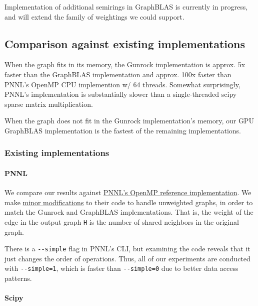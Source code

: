\documentclass[10pt,oneside]{memoir}
\let\oldparagraph\paragraph
\renewcommand{\paragraph}[1]{\oldparagraph{#1}\mbox{}}
\begin{document}
Implementation of additional semirings in GraphBLAS is currently in
progress, and will extend the family of weightings we could support.

\hypertarget{comparison-against-existing-implementations-6}{%
\subsection{Comparison against existing
implementations}\label{comparison-against-existing-implementations-6}}

When the graph fits in its memory, the Gunrock implementation is approx.
5x faster than the GraphBLAS implementation and approx. 100x faster than
PNNL's OpenMP CPU implemention w/ 64 threads. Somewhat surprisingly,
PNNL's implementation is substantially slower than a single-threaded
scipy sparse matrix multiplication.

When the graph does not fit in the Gunrock implementation's memory, our
GPU GraphBLAS implementation is the fastest of the remaining
implementations.

\hypertarget{existing-implementations}{%
\subsubsection{Existing
implementations}\label{existing-implementations}}

\hypertarget{pnnl}{%
\paragraph{PNNL}\label{pnnl}}

We compare our results against
\href{https://gitlab.hiveprogram.com/jfiroz/graph_projection}{PNNL's
OpenMP reference implementation}. We make
\href{https://gitlab.hiveprogram.com/bjohnson/graph_projection/commit/b37aabe2e56fe5207bc22c09c029b7e88c0327c1}{minor
modifications} to their code to handle unweighted graphs, in order to
match the Gunrock and GraphBLAS implementations. That is, the weight of
the edge in the output graph \texttt{H} is the number of shared
neighbors in the original graph.

There is a \texttt{-\/-simple} flag in PNNL's CLI, but examining the
code reveals that it just changes the order of operations. Thus, all of
our experiments are conducted with \texttt{-\/-simple=1}, which is
faster than \texttt{-\/-simple=0} due to better data access patterns.

\hypertarget{scipy}{%
\paragraph{Scipy}\label{scipy}}
\end{document}
